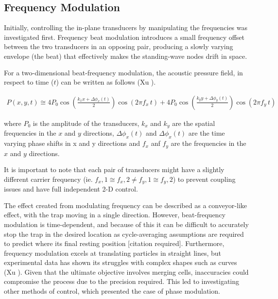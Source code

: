 \documentclass[11pt,a4paper]{article}
\begin{document}
\subsection{Frequency Modulation}
\label{frequency modulation}

Initially, controlling the in-plane transducers by manipulating the frequencies was investigated first. Frequency beat modulation introduces a small frequency offset between the two transducers in an opposing pair, producing a slowly varying envelope (the beat) that effectively makes the standing-wave nodes drift in space. 

For a two-dimensional beat-frequency modulation, the acoustic pressure field, in respect to time ($t$) can be written as follows (Xu \cite{Xu2026Velocity-controlledManipulation}).

\begin{equation}
\begin{aligned}
    P(x,y,t) \cong 4P_0 \cos\left( \frac{k_x x + \Delta\phi_x(t)}{2} \right) \cos\left( 2\pi f_x\, t \right) + 4P_0 \cos\left( \frac{k_y y + \Delta\phi_y(t)}{2} \right) \cos\left( 2\pi f_y\, t \right)
\end{aligned}
\label{eq:simplified_frequency}
\end{equation}

where $P_0$ is the amplitude of the transducers, $k_x$ and $k_y$ are the spatial frequencies in the $x$ and $y$ directions, $\Delta\phi_x(t)$ and $\Delta\phi_x(t)$ are the time varying phase shifts in x and y directions and $f_x$ anf $f_y$ are the frequencies in the $x$ and $y$ directions.

It is important to note that each pair of transducers might have a slightly different carrier frequency (ie. $f_x,1 \cong f_x,2 \neq f_y,1\cong f_y,2$) to prevent coupling issues and have full independent 2-D control.

The effect created from modulating frequency can be described as a conveyor-like effect, with the trap moving in a single direction. However, beat-frequency modulation is time-dependent, and because of this it can be difficult to accurately stop the trap in the desired location as cycle-averaging assumptions are required to predict where its final resting position [citation required]. Furthermore, frequency modulation excels at translating particles in straight lines, but experimental data has shown its struggles with complex shapes such as curves (Xu \cite{Xu2026Velocity-controlledManipulation}). Given that the ultimate objective involves merging cells, inaccuracies could compromise the process due to the precision required. This led to investigating other methods of control, which presented the case of phase modulation.
\end{document}
